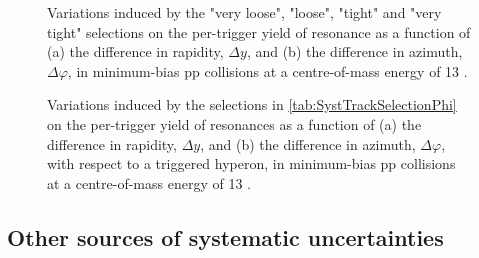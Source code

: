 \begin{figure}[!p]
\centering
{}
\centering
{}
\caption{Variations induced by the "very loose", "loose", "tight" and "very tight"  \rmXiPM selections on the per-trigger yield of \rmPhiMes resonance as a function of (a) the difference in rapidity, $\Delta y$, and (b) the difference in azimuth, $\Delta \varphi$, in minimum-bias pp collisions at a centre-of-mass energy of 13 \tev.}
	\label{fig:SystPerTriggerYieldXiRatioCascade}
\end{figure}

\begin{figure}[!p]
\centering
{}
\centering
{}
\caption{Variations induced by the selections in \tab\ref{tab:SystTrackSelectionPhi} on the per-trigger yield of \rmPhiMes resonances as a function of (a) the difference in rapidity, $\Delta y$, and (b) the difference in azimuth, $\Delta \varphi$, with respect to a triggered \rmXi hyperon, in minimum-bias pp collisions at a centre-of-mass energy of 13 \tev.}
	\label{fig:SystPerTriggerYieldXiRatio}
\end{figure}

\clearpage

\subsection{Other sources of systematic uncertainties}

